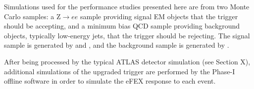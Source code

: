 
Simulations used for the performance studies presented here are from two Monte
Carlo samples: a Z$\to ee$ sample providing signal EM objects that the trigger
should be accepting, and a minimum bias QCD sample providing background objects,
typically low-energy jets, that the trigger should be rejecting. The signal
sample is generated by 
\powheg \cite{Frixione2007}
and \pythia \cite{Sjostrand2006, Sjostrand2008},
and the background sample is generated by \pythia.

After being processed by the typical ATLAS detector simulation (see Section
X), %
additional simulations of the upgraded trigger are performed by the Phase-I
offline software in order to simulate the \ac{eFEX} response to each event.
